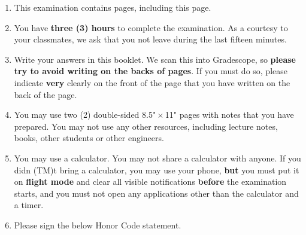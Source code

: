 \documentclass{article}
\begin{document}
    \begin{enumerate}[label=\arabic*.]
        \item This examination contains \pageref{LastPage} pages, including this page.

        \item You have \textbf{three (3) hours} to complete the examination.  As a courtesy to your classmates, we ask that you not leave during the last fifteen minutes.

        \item Write your answers in this booklet.  We scan this into Gradescope, so \textbf{please try to avoid writing on the backs of pages}.  If you must do so, please indicate \textbf{very} clearly on the front of the page that you have written on the back of the page.

        \item You may use two (2) double-sided 8.5"\,$\times$\,11" pages with notes that you have prepared. You may not use any other resources, including lecture notes, books, other students or other engineers.

        \item You may use a calculator. You may not share a calculator with anyone.  If you didn (TM)t bring a calculator, you may use your phone, \textbf{but} you must put it on \textbf{flight mode} and clear all visible notifications \textbf{before} the examination starts, and you must not open any applications other than the calculator and a timer.

        \item Please sign the below Honor Code statement.
    \end{enumerate}


    

\fi


\end{document}
